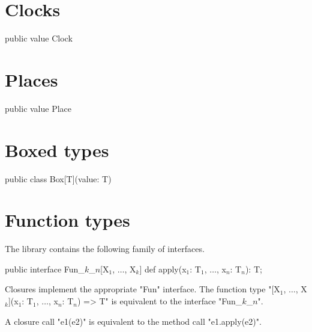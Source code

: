 \section{Clocks}

\begin{xten}
public value Clock { }
\end{xten}

\section{Places}

\begin{xten}
public value Place { }
\end{xten}

\section{Boxed types}

\begin{xten}
public class Box[T](value: T) { }
\end{xten}

\section{Function types}

The library contains the following family of interfaces.

\begin{xtenmath}
public interface Fun_$k$_$n$[X$_1$, $\dots$, X$_k$] {
    def apply(x$_1$: T$_1$, $\dots$, x$_n$: T$_n$): T;
}
\end{xtenmath}

Closures implement the appropriate \xcd"Fun" interface.  The
function type \xcdmath"[X$_1$, $\dots$, X$_k$](x$_1$: T$_1$, $\dots$, x$_n$: T$_n$) => T"
is equivalent to the interface \xcdmath"Fun_$k$_$n$".

A closure call \xcd"e1(e2)" is equivalent to 
the method call \xcd"e1.apply(e2)".
\fi
